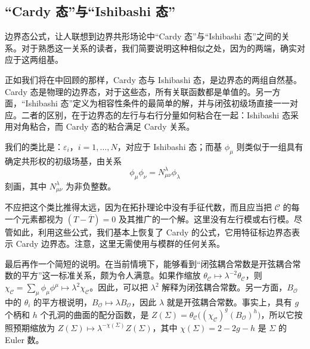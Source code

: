 \subsection{“Cardy 态”与“Ishibashi 态”}\label{sec:2.3.1}

边界态公式，让人联想到边界共形场论中“Cardy 态”与“Ishibashi 态”之间的关系。对于熟悉这一关系的读者，我们简要说明这种相似之处，因为的两端，确实对应于这两组基。

正如我们将在中回顾的那样，Cardy 态与 Ishibashi 态，是边界态的两组自然基。Cardy 态是物理的边界态，对于这些态，所有关联函数都是单值的。另一方面，“Ishibashi 态”定义为相容性条件的最简单的解，并与闭弦初级场直接一一对应。二者的区别，在于边界态的左行与右行分量如何粘合在一起：Ishibashi 态采用对角粘合，而 Cardy 态的粘合满足 Cardy 关系。

我们的类比是：$\varepsilon_i$，$i=1,\ldots,N$，对应于 Ishibashi 态；而基 $\phi_\mu$ 则类似于一组具有确定共形权的初级场基，由关系
\begin{equation}\label{eq:2.56}
\phi_\mu\phi_\nu=N_{\mu\nu}^{\lambda}\phi_\lambda
\end{equation}
刻画，其中 $N_{\mu\nu}^{\lambda}$ 为非负整数。

不应把这个类比推得太远，因为在拓扑理论中没有手征代数，而且应当把 $\mathcal{C}$ 的每一个元素都视为 $(T-\overline{T})=0$ 及其推广的一个解。这里没有左行模或右行模。尽管如此，利用这些公式，我们基本上恢复了 Cardy 的公式，它用特征标边界态表示 Cardy 边界态。注意，这里无需使用与模群的任何关系。

最后再作一个简短的说明。在当前情境下，能够看到“闭弦耦合常数是开弦耦合常数的平方”这一标准关系，颇为令人满意。如果作缩放 $\theta_{\mathcal{C}}\mapsto\lambda^{-2}\theta_{\mathcal{C}}$，则 $\chi_{\mathcal{C}}=\sum_\mu\phi_\mu\phi^\mu\mapsto\lambda^2\chi_{\mathcal{C}}$。因此，可以把 $\lambda^2$ 解释为闭弦耦合常数。另一方面，$B_{\mathcal{O}}$ 中的 $\theta_i$ 的平方根说明，$B_{\mathcal{O}}\mapsto\lambda B_{\mathcal{O}}$，因此 $\lambda$ 就是开弦耦合常数。事实上，具有 $g$ 个柄和 $h$ 个孔洞的曲面的配分函数，是 $Z(\Sigma)=\theta_{\mathcal{C}}\bigl((\chi_{\mathcal{C}})^g(B_{\mathcal{O}})^h\bigr)$，所以它按照预期缩放为 $Z(\Sigma)\mapsto\lambda^{-\chi(\Sigma)}Z(\Sigma)$，其中 $\chi(\Sigma)=2-2g-h$ 是 $\Sigma$ 的 Euler 数。

